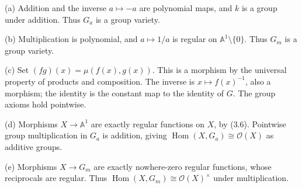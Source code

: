 (a) Addition and the inverse $a\mapsto-a$ are polynomial maps, and $k$ is a group under addition. Thus $G_a$ is a group variety.

(b) Multiplication is polynomial, and $a\mapsto1/a$ is regular on $\mathbb A^1\setminus\{0\}$. Thus $G_m$ is a group variety.

(c) Set $(fg)(x)=\mu(f(x),g(x))$. This is a morphism by the universal property of products and composition. The inverse is $x\mapsto f(x)^{-1}$, also a morphism; the identity is the constant map to the identity of $G$. The group axioms hold pointwise.

(d) Morphisms $X\to\mathbb A^1$ are exactly regular functions on $X$, by (3.6). Pointwise group multiplication in $G_a$ is addition, giving $\operatorname{Hom}(X,G_a)\cong\mathcal O(X)$ as additive groups.

(e) Morphisms $X\to G_m$ are exactly nowhere-zero regular functions, whose reciprocals are regular. Thus $\operatorname{Hom}(X,G_m)\cong\mathcal O(X)^\times$ under multiplication.
